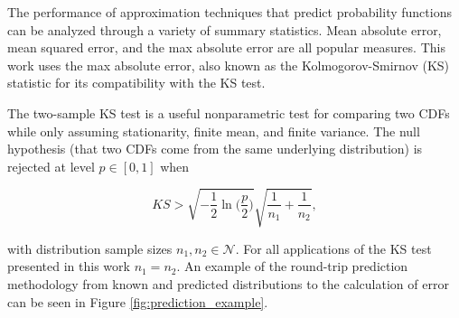 \documentclass[sigconf]{acmart}
\begin{document}



The performance of approximation techniques that predict probability functions can be analyzed through a variety of summary statistics. Mean absolute error, mean squared error, and the max absolute error are all popular measures. This work uses the max absolute error, also known as the Kolmogorov-Smirnov (KS) statistic \cite{lilliefors1967kolmogorov} for its compatibility with the KS test.

The two-sample KS test is a useful nonparametric test for comparing two CDFs while only assuming stationarity, finite mean, and finite variance. The null hypothesis (that two CDFs come from the same underlying distribution) is rejected at level $p \in [0,1]$ when

$$ KS > \sqrt{-\frac{1}{2}\ln\biggl(\frac{p}{2}\biggr)} \sqrt{\frac{1}{n_1} + \frac{1}{n_2}}, $$

with distribution sample sizes $n_1,n_2 \in \mathcal{N}$. For all applications of the KS test presented in this work $n_1 = n_2$. An example of the round-trip prediction methodology from known and predicted distributions to the calculation of error can be seen in Figure \ref{fig:prediction_example}.
\end{document}
